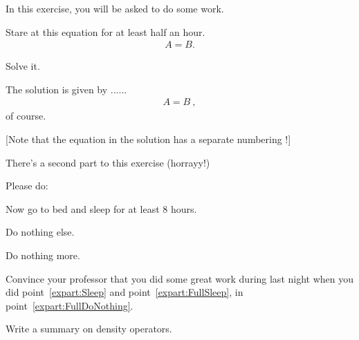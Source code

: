 \documentclass[11pt,a4paper]{article}
\begin{document}
\MakeUebungHeader


In this exercise, you will be asked to do some work.


\begin{exenumerate}
\item Stare at this equation for at least half an hour.
  \begin{align}
    A = B.
  \end{align}

\item Solve it.

  \begin{loesung}
    The solution is given by ...... 
    \begin{align}
      A=B\ ,
    \end{align}
    of course.

    [Note that the equation in the solution has a separate numbering !]
  \end{loesung}
\end{exenumerate}

There's a second part to this exercise (horrayy!)


\begin{exenumerate} %
\item {}
  Please do:
  \begin{exenumerate}
  \item \label{expart:Sleep}
    Now go to bed and sleep for at least 8 hours.
  \item {}
    Do nothing else.
  \item Do nothing more.
  \end{exenumerate}

\item Convince your professor that you did some great work during last night when you did
  point~\ref{expart:Sleep} and point~\ref{expart:FullSleep}, in
  point~\ref{expart:FullDoNothing}.

\item Write a summary on density operators.

\end{exenumerate}
\end{document}
